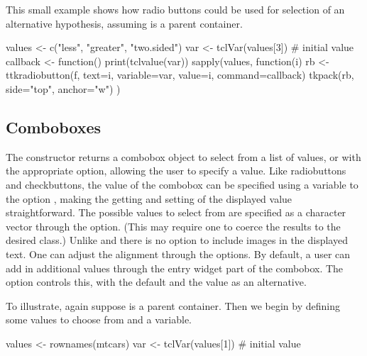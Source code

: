This small example shows how radio buttons could be used for selection
of an alternative hypothesis, assuming  is a parent container.

\begin{Schunk}
\begin{Sinput}
 values <- c("less", "greater", "two.sided")
 var <- tclVar(values[3])                # initial value
 callback <- function() print(tclvalue(var))
 sapply(values, function(i) {
   rb <- ttkradiobutton(f, text=i, variable=var, 
                        value=i, command=callback)
   tkpack(rb, side="top", anchor="w")
 })
\end{Sinput}
\end{Schunk}


\subsection{Comboboxes}
\label{sec:tcltk:comboboxes}

The  constructor returns a combobox object to
select from a list of values, or with the appropriate option, allowing
the user to specify a value. Like radiobuttons and checkbuttons, the
value of the combobox can be specified using a \TCL\/ variable to the
option , making the getting and
setting of the displayed value straightforward. The possible values to
select from are specified as a character vector through the
 option. (This may require one to coerce
the results to the desired class.) Unlike \GTK{} and \Qt{} there is no option to
include images in the displayed text. One can adjust the alignment
through the  options.  By default, a user
can add in additional values through the entry widget part of the
combobox. The  option controls this, with
the default   and the value  as an
alternative.

To illustrate, again suppose  is a parent container. Then we
begin by defining some values to choose from and a \TCL\/ variable.


\begin{Schunk}
\begin{Sinput}
 values <- rownames(mtcars)
 var <- tclVar(values[1])                # initial value
\end{Sinput}
\end{Schunk}

